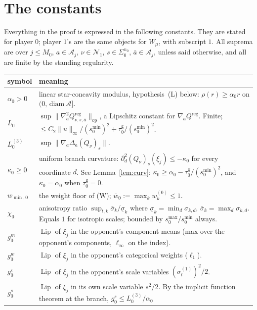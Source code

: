 \documentclass[11pt]{article}
\theoremstyle{definition}
\newcommand{\cA}{\mathcal{A}}
\newcommand{\cN}{\mathcal{N}}
\newcommand{\Lip}{\operatorname{Lip}}
\begin{document}
\section{The constants}\label{sec:constants}

Everything in the proof is expressed in the following constants. They are stated
for player $0$; player $1$'s are the same objects for $W_\mu$, with subscript $1$.
All suprema are over $j \le M_0$, $a \in \cA_j$, $\nu \in \cN_1$,
$s \in \Sigma_0^{n_0}$, $\bar a \in \cA_j$, unless said otherwise, and all are
finite by the standing regularity.

\begin{center}
\begin{tabular}{@{}l p{}@{}}
\hline
symbol & meaning\\
\hline
$\alpha_0 > 0$ & linear star-concavity modulus, hypothesis~(L) below:
  $\rho(r) \ge \alpha_0 r$ on $(0,\, \mathrm{diam}\,\cA]$.\\
$L_0$ & $\sup \|\nabla^2_a Q^{\mathrm{reg}}_{\nu,s,\bar a}\|_{\mathrm{op}}$, a
  Lipschitz constant for $\nabla_a Q^{\mathrm{reg}}$. Finite; $\le C_2\|u\|_\infty
  /(s^{\min}_0)^2 + \tau^{\mathrm g}_0/(s^{\min}_0)^2$.\\
$L^{(3)}_0$ & $\sup \|\nabla_a \Delta_a (Q_\nu)_s\|$.\\
$\kappa_0 \ge 0$ & uniform branch curvature:
  $\partial_d^2 (Q_\nu)_s(\xi_j) \le -\kappa_0$ for every coordinate $d$. See
  Lemma~\ref{lem:curv}: $\kappa_0 \ge \alpha_0 - \tau^{\mathrm g}_0/(s^{\min}_0)^2$,
  and $\kappa_0 = \alpha_0$ when $\tau^{\mathrm g}_0 = 0$.\\
$w_{\min,0}$ & the weight floor of (W); $\bar w_0 := \max_k w^{(0)}_k \le 1$.\\
$\chi_0$ & anisotropy ratio $\sup_{t,k} \bar\sigma_k/\underline\sigma_k$ where
  $\underline\sigma_k = \min_d \sigma_{k,d}$, $\bar\sigma_k = \max_d\sigma_{k,d}$.
  Equals $1$ for isotropic scales; bounded by $s^{\max}_0/s^{\min}_0$ always.\\
$g^m_0$ & $\Lip$ of $\xi_j$ in the opponent's component means (max over the
  opponent's components, $\ell_\infty$ on the index).\\
$g^w_0$ & $\Lip$ of $\xi_j$ in the opponent's categorical weights ($\ell_1$).\\
$g^\varsigma_0$ & $\Lip$ of $\xi_j$ in the opponent's scale variables
  $(\sigma^{(1)}_l)^2/2$.\\
$g^s_0$ & $\Lip$ of $\xi_j$ in its own scale variable $s^2/2$. By the implicit
  function theorem at the branch, $g^s_0 \le L^{(3)}_0/\alpha_0$

\end{tabular}
\end{center}
\end{document}
